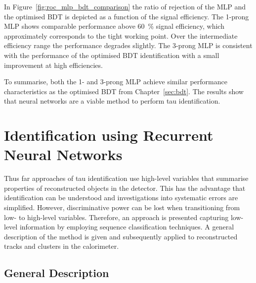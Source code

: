In Figure~\ref{fig:roc_mlp_bdt_comparison} the ratio of rejection of the MLP and
the optimised BDT is depicted as a function of the signal efficiency. The
1-prong MLP shows comparable performance above \SI{60}{\percent} signal
efficiency, which approximately corresponds to the tight working point. Over the
intermediate efficiency range the performance degrades slightly. The 3-prong MLP
is consistent with the performance of the optimised BDT identification with a
small improvement at high efficiencies.

To summarise, both the 1- and 3-prong MLP achieve similar performance
characteristics as the optimised BDT from Chapter~\ref{sec:bdt}. The results
show that neural networks are a viable method to perform tau identification.

\section{Identification using Recurrent Neural Networks}
\label{sec:rnn_id}

Thus far approaches of tau identification use high-level variables that
summarise properties of reconstructed objects in the detector. This has the
advantage that identification can be understood and investigations into
systematic errors are simplified. However, discriminative power can be lost when
transitioning from low- to high-level variables. Therefore, an approach is
presented capturing low-level information by employing sequence classification
techniques. A general description of the method is given and subsequently
applied to reconstructed tracks and clusters in the calorimeter.

\subsection{General Description}
\label{sec:rnn_descr}

